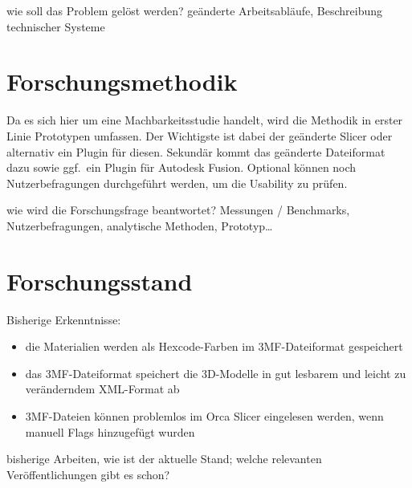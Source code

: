 wie soll das Problem gelöst werden? geänderte Arbeitsabläufe, Beschreibung technischer Systeme

\section{Forschungsmethodik}
Da es sich hier um eine Machbarkeitsstudie handelt, wird die Methodik in erster Linie Prototypen umfassen. 
Der Wichtigste ist dabei der ge\"anderte Slicer oder alternativ ein Plugin f\"ur diesen. 
Sekund\"ar kommt das ge\"anderte Dateiformat dazu sowie ggf.\ ein Plugin f\"ur Autodesk Fusion.
Optional k\"onnen noch Nutzerbefragungen durchgef\"uhrt werden, um die Usability zu pr\"ufen.

wie wird die Forschungsfrage beantwortet? Messungen / Benchmarks, Nutzerbefragungen, analytische Methoden, Prototyp\dots

\section{Forschungsstand}
Bisherige Erkenntnisse: 
\begin{itemize}
    \item die Materialien werden als Hexcode-Farben im 3MF-Dateiformat gespeichert
    \item das 3MF-Dateiformat speichert die 3D-Modelle in gut lesbarem und leicht zu ver\"anderndem XML-Format ab 
    \item 3MF-Dateien k\"onnen problemlos im Orca Slicer eingelesen werden, wenn manuell Flags hinzugef\"ugt wurden
\end{itemize}

bisherige Arbeiten, wie ist der aktuelle Stand; welche relevanten Ver\"offentlichungen gibt es schon? 
